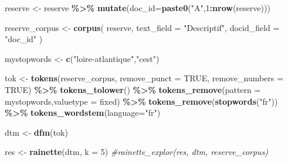 \documentclass[
]{book}
\newenvironment{Shaded}{\begin{snugshade}}{\end{snugshade}}
\newcommand{\AttributeTok}[1]{\textcolor[rgb]{0.13,0.29,0.53}{#1}}
\newcommand{\CommentTok}[1]{\textcolor[rgb]{0.56,0.35,0.01}{\textit{#1}}}
\newcommand{\ConstantTok}[1]{\textcolor[rgb]{0.56,0.35,0.01}{#1}}
\newcommand{\DecValTok}[1]{\textcolor[rgb]{0.00,0.00,0.81}{#1}}
\newcommand{\FunctionTok}[1]{\textcolor[rgb]{0.13,0.29,0.53}{\textbf{#1}}}
\newcommand{\NormalTok}[1]{#1}
\newcommand{\OtherTok}[1]{\textcolor[rgb]{0.56,0.35,0.01}{#1}}
\newcommand{\SpecialCharTok}[1]{\textcolor[rgb]{0.81,0.36,0.00}{\textbf{#1}}}
\newcommand{\StringTok}[1]{\textcolor[rgb]{0.31,0.60,0.02}{#1}}
\begin{document}
\begin{Shaded}
\begin{Highlighting}[]
\NormalTok{reserve }\OtherTok{\textless{}{-}}\NormalTok{ reserve }\SpecialCharTok{\%\textgreater{}\%} \FunctionTok{mutate}\NormalTok{(}\AttributeTok{doc\_id=}\FunctionTok{paste0}\NormalTok{(}\StringTok{"A"}\NormalTok{,}\DecValTok{1}\SpecialCharTok{:}\FunctionTok{nrow}\NormalTok{(reserve)))}

\NormalTok{reserve\_corpus }\OtherTok{\textless{}{-}} \FunctionTok{corpus}\NormalTok{(}
\NormalTok{  reserve,}
  \AttributeTok{text\_field =} \StringTok{"Descriptif"}\NormalTok{,}
  \AttributeTok{docid\_field =} \StringTok{"doc\_id"}
\NormalTok{)}

\NormalTok{mystopwords }\OtherTok{\textless{}{-}} \FunctionTok{c}\NormalTok{(}\StringTok{"loire{-}atlantique"}\NormalTok{,}\StringTok{"c\textquotesingle{}est"}\NormalTok{)}

\NormalTok{tok }\OtherTok{\textless{}{-}} \FunctionTok{tokens}\NormalTok{(reserve\_corpus, }\AttributeTok{remove\_punct =} \ConstantTok{TRUE}\NormalTok{, }\AttributeTok{remove\_numbers =} \ConstantTok{TRUE}\NormalTok{) }\SpecialCharTok{\%\textgreater{}\%}
  \FunctionTok{tokens\_tolower}\NormalTok{() }\SpecialCharTok{\%\textgreater{}\%}
  \FunctionTok{tokens\_remove}\NormalTok{(}\AttributeTok{pattern =}\NormalTok{ mystopwords,}\AttributeTok{valuetype =} \StringTok{\textquotesingle{}fixed\textquotesingle{}}\NormalTok{) }\SpecialCharTok{\%\textgreater{}\%}
  \FunctionTok{tokens\_remove}\NormalTok{(}\FunctionTok{stopwords}\NormalTok{(}\StringTok{"fr"}\NormalTok{)) }\SpecialCharTok{\%\textgreater{}\%}
  \FunctionTok{tokens\_wordstem}\NormalTok{(}\AttributeTok{language=}\StringTok{"fr"}\NormalTok{) }
  
\NormalTok{dtm }\OtherTok{\textless{}{-}} \FunctionTok{dfm}\NormalTok{(tok)}

\NormalTok{res }\OtherTok{\textless{}{-}} \FunctionTok{rainette}\NormalTok{(dtm, }\AttributeTok{k =} \DecValTok{5}\NormalTok{)}
\CommentTok{\#rainette\_explor(res, dtm, reserve\_corpus)}
\end{Highlighting}
\end{Shaded}
\end{document}
